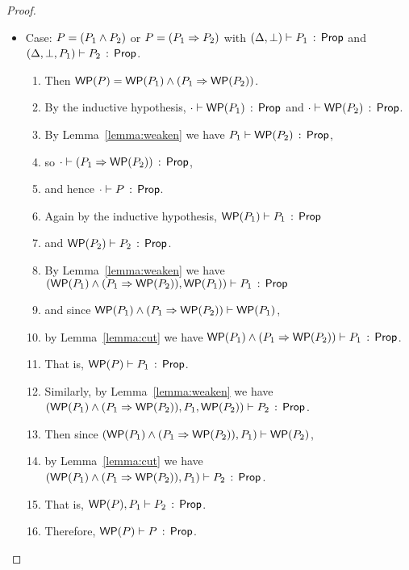 \documentclass[10pt,letter]{article}
\begin{document}
\begin{proof}
\begin{itemize}
      
  \item Case: $P = (P_1 \wedge P_2)$ or $P = (P_1 \Rightarrow P_2)$ with
       $(\Delta,\bot) \vdash P_1\, :\, \mathsf{Prop}$ and 
              $(\Delta,\bot,P_1) \vdash P_2\, :\, \mathsf{Prop}$.
       \begin{enumerate}
       \item Then $\mathop{\mathsf{WP}}(P) = \mathop{\mathsf{WP}}(P_1) \wedge (P_1 \Rightarrow \mathop{\mathsf{WP}}(P_2))$.
       \item By the inductive hypothesis,
         $\cdot \vdash \mathop{\mathsf{WP}}(P_1)\, :\, \mathsf{Prop}$
         and $\cdot \vdash \mathop{\mathsf{WP}}(P_2)\, :\, \mathsf{Prop}$.
       \item 
       		By Lemma~\ref{lemma:weaken} we have 
			$P_1 \vdash \mathop{\mathsf{WP}}(P_2)\, :\, \mathsf{Prop}$,
		\item
			so $\cdot \vdash (P_1 \Rightarrow \mathop{\mathsf{WP}}(P_2))\, :\, \mathsf{Prop}$,
		\item
		 	and hence $\cdot \vdash P\, :\, \mathsf{Prop}$.
	    \item
	        Again by the inductive hypothesis,
	        $\mathop{\mathsf{WP}}(P_1) \vdash P_1\, :\, \mathsf{Prop}$
	    \item
	        and $\mathop{\mathsf{WP}}(P_2) \vdash P_2\, :\, \mathsf{Prop}$.
	    \item
	        By Lemma~\ref{lemma:weaken} we have
	        $(\mathop{\mathsf{WP}}(P_1) \wedge (P_1 \Rightarrow \mathop{\mathsf{WP}}(P_2)),\mathop{\mathsf{WP}}(P_1)) \vdash P_1\, :\, \mathsf{Prop}$
	    \item
	        and since
	        $\mathop{\mathsf{WP}}(P_1) \wedge (P_1 \Rightarrow \mathop{\mathsf{WP}}(P_2)) \vdash \mathop{\mathsf{WP}}(P_1)$,
	    \item
	        by Lemma~\ref{lemma:cut} we have
	        	$\mathop{\mathsf{WP}}(P_1) \wedge (P_1 \Rightarrow \mathop{\mathsf{WP}}(P_2)) \vdash P_1\, :\, \mathsf{Prop}$.
	    \item
	        That is, $\mathop{\mathsf{WP}}(P) \vdash P_1\, :\, \mathsf{Prop}$.
	    \item
	        Similarly, by Lemma~\ref{lemma:weaken} we have
	        $(\mathop{\mathsf{WP}}(P_1) \wedge (P_1 \Rightarrow \mathop{\mathsf{WP}}(P_2)),P_1,\mathop{\mathsf{WP}}(P_2)) \vdash P_2\, :\, \mathsf{Prop}$.
	    \item 
	        Then since
	        $(\mathop{\mathsf{WP}}(P_1) \wedge (P_1 \Rightarrow \mathop{\mathsf{WP}}(P_2)),P_1) \vdash \mathop{\mathsf{WP}}(P_2)$,
	    \item
	        by Lemma~\ref{lemma:cut} we have
	        $(\mathop{\mathsf{WP}}(P_1) \wedge (P_1 \Rightarrow \mathop{\mathsf{WP}}(P_2)),P_1) \vdash P_2\, :\, \mathsf{Prop}$.
	    \item
	        That is,
	        $\mathop{\mathsf{WP}}(P),P_1 \vdash P_2\, :\, \mathsf{Prop}$.
	    \item
	        Therefore,
	        $\mathop{\mathsf{WP}}(P) \vdash P\, :\, \mathsf{Prop}$.    
       \end{enumerate}
  \end{itemize}
\end{proof}
\end{document}
